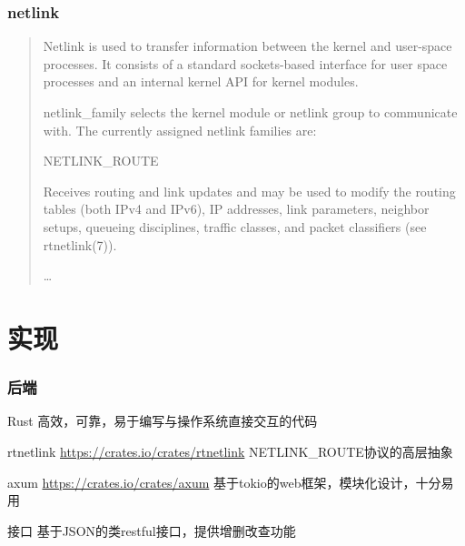 \documentclass{ctexbeamer}
\begin{document}
\begin{frame}[fragile]
\frametitle{netlink}
\begin{quotation}
  Netlink is used to transfer information between the kernel and
  user-space processes. It consists of a standard sockets-based
  interface for user space processes and an internal kernel API for
  kernel modules.

  netlink\_family selects the kernel module or netlink group to
  communicate with. The currently assigned netlink families are:

  \begin{adjustwidth}{0.5cm}{}
    NETLINK\_ROUTE
  \end{adjustwidth}

  \begin{adjustwidth}{1cm}{}
    Receives routing and link updates and may be used to
    modify the routing tables (both IPv4 and IPv6), IP
    addresses, link parameters, neighbor setups, queueing
    disciplines, traffic classes, and packet classifiers (see
    rtnetlink(7)).
  \end{adjustwidth}

  \ldots
\end{quotation}
\end{frame}

\section{实现}
\begin{frame}
\frametitle{后端}
\begin{exampleblock}{Rust}
高效，可靠，易于编写与操作系统直接交互的代码
\end{exampleblock}
\begin{exampleblock}{rtnetlink \url{https://crates.io/crates/rtnetlink}}
NETLINK\_ROUTE协议的高层抽象
\end{exampleblock}
\begin{exampleblock}{axum \url{https://crates.io/crates/axum}}
基于tokio的web框架，模块化设计，十分易用
\end{exampleblock}
\begin{block}{接口}
基于JSON的类restful接口，提供增删改查功能  
\end{block}
\end{frame}
\end{document}
